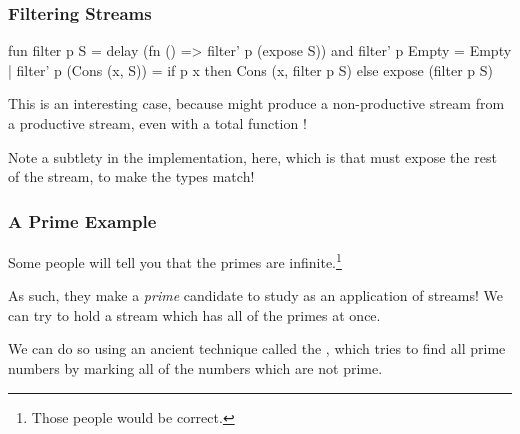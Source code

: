 \documentclass[aspectratio=169, handout]{beamer}
\begin{document}
\begin{frame}[fragile]
  \frametitle{Filtering Streams}

  \begin{codeblock}
    fun filter  p S = delay (fn () => filter' p (expose S))
    and filter' p Empty = Empty
      | filter' p (Cons (x, S)) =
          if p x then Cons (x, filter p S)
          else expose (filter p S)
  \end{codeblock}

  \pause
  \vspace{\fill}

  This is an interesting case, because  might produce a non-productive
  stream from a productive stream, even with a total function !

  \pause
  \vspace{\fill}

  Note a subtlety in the implementation, here, which is that  must
  expose the rest of the stream, to make the types match!

  \pause
  \vspace{\fill}

\end{frame}


\begin{frame}[fragile]
  \frametitle{A Prime Example}

  Some people will tell you that the primes are infinite.\footnote{Those people would be correct.}

  \pause
  \vspace{\fill}

  As such, they make a \textit{prime} candidate to study as an application of
  streams! We can try to hold a stream which has all of the primes at once.

  \pause
  \vspace{\fill}

  We can do so using an ancient technique called the ,
  which tries to find all prime numbers by marking all of the numbers which are
  not prime.
\end{frame}
\end{document}
